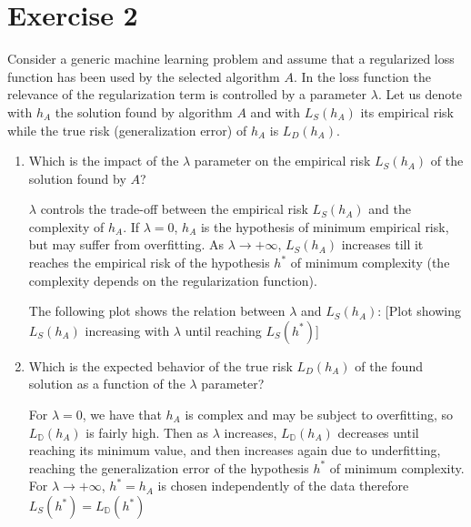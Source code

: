 \documentclass[a4paper,11pt,oneside]{book}
\begin{document}
\section{Exercise 2}
Consider a generic machine learning problem and assume that a regularized loss function has been used by the selected algorithm $A$. In the loss function the relevance of the regularization term is controlled by a parameter $\lambda$. Let us denote with $h_A$ the solution found by algorithm $A$ and with $L_S(h_A)$ its empirical risk while the true risk (generalization error) of $h_A$ is $L_D(h_A)$.
\begin{enumerate}
    \item Which is the impact of the $\lambda$ parameter on the empirical risk $L_S(h_A)$ of the solution found by $A$?
        \begin{solution}
            $\lambda$ controls the trade-off between the empirical risk $L_S(h_A)$ and the complexity of $h_A$. 
            If $\lambda=0$, $h_A$ is the hypothesis of minimum empirical risk, but may suffer from overfitting. As $\lambda \to +\infty$, $L_S(h_A)$ increases till it reaches the empirical risk of the hypothesis $h^*$ of minimum complexity (the complexity depends on the regularization function).
            
            The following plot shows the relation between $\lambda$ and $L_S(h_A)$:
            [Plot showing $L_S(h_A)$ increasing with $\lambda$ until reaching $L_S(h^*)$]
        \end{solution}
    \item Which is the expected behavior of the true risk $L_D(h_A)$ of the found solution as a function of the $\lambda$ parameter?
        \begin{solution}
            For $\lambda=0$, we have that $h_A$ is complex and may be subject to overfitting, so $L_\mathbb{D}(h_A)$ is fairly high. Then as $\lambda$ increases, $L_\mathbb{D}(h_A)$ decreases until reaching its minimum value, and then increases again due to underfitting, reaching the generalization error of the hypothesis $h^*$ of minimum complexity. For $\lambda \to +\infty$, $h^*=h_A$ is chosen independently of the data therefore $L_S(h^*)=L_\mathbb{D}(h^*)$
            

\end{solution}
\end{enumerate}
\end{document}
